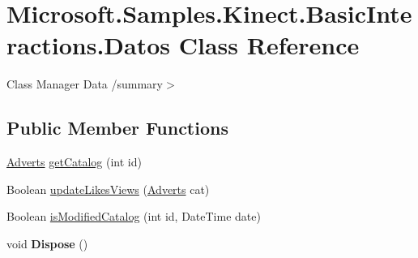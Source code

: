 \hypertarget{class_microsoft_1_1_samples_1_1_kinect_1_1_basic_interactions_1_1_datos}{\section{Microsoft.\-Samples.\-Kinect.\-Basic\-Interactions.\-Datos Class Reference}
\label{class_microsoft_1_1_samples_1_1_kinect_1_1_basic_interactions_1_1_datos}
}


Class Manager Data /summary$>$  


\subsection*{Public Member Functions}
\begin{DoxyCompactItemize}
\item 
\hyperlink{class_microsoft_1_1_samples_1_1_kinect_1_1_basic_interactions_1_1_adverts}{Adverts} \hyperlink{class_microsoft_1_1_samples_1_1_kinect_1_1_basic_interactions_1_1_datos_a4bb4b5b84378844201d0381aa362aa1b}{get\-Catalog} (int id)
\item 
Boolean \hyperlink{class_microsoft_1_1_samples_1_1_kinect_1_1_basic_interactions_1_1_datos_a84ae94fa9de8b6bfe7addf66b0c59311}{update\-Likes\-Views} (\hyperlink{class_microsoft_1_1_samples_1_1_kinect_1_1_basic_interactions_1_1_adverts}{Adverts} cat)
\item 
Boolean \hyperlink{class_microsoft_1_1_samples_1_1_kinect_1_1_basic_interactions_1_1_datos_ab9b9805f6e5567e7a918f6e59f8e3fc3}{is\-Modified\-Catalog} (int id, Date\-Time date)
\item 
\hypertarget{class_microsoft_1_1_samples_1_1_kinect_1_1_basic_interactions_1_1_datos_aac7ca32c71f5914cd485553df524bdff}{void {\bfseries Dispose} ()}\label{class_microsoft_1_1_samples_1_1_kinect_1_1_basic_interactions_1_1_datos_aac7ca32c71f5914cd485553df524bdff}


\end{DoxyCompactItemize}
